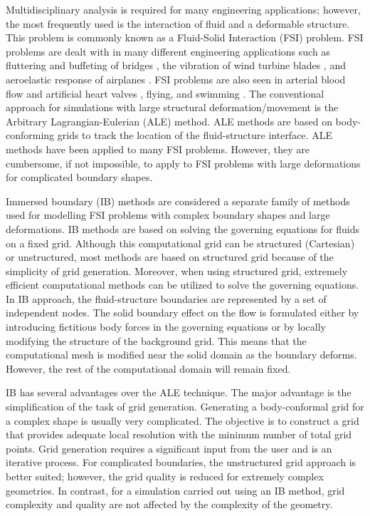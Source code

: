 Multidisciplinary analysis is required for many engineering applications; however, the most frequently used is the interaction of fluid and a deformable structure. This problem is commonly known as a Fluid-Solid Interaction (FSI) problem. FSI problems are dealt with in many different engineering applications such as fluttering and buffeting of bridges \cite{jain1996coupled}, the vibration of wind turbine blades \cite{arrigan2011control}, and aeroelastic response of airplanes \cite{farhat2006provably}. FSI problems are also seen in arterial blood flow and artificial heart valves \cite{sotiropoulos2009review}, flying, and swimming \cite{kern2006simulations}. The conventional approach for simulations with large structural deformation/movement is the Arbitrary Lagrangian-Eulerian (ALE) method. ALE methods are based on body-conforming grids to track the location of the fluid-structure interface. ALE methods have been applied to many FSI problems. However, they are cumbersome, if not impossible, to apply to FSI problems with large deformations for complicated boundary shapes.

Immersed boundary (IB) methods are considered a separate family of methods used for modelling FSI problems with complex boundary shapes and large deformations. IB methods are based on solving the governing equations for fluids on a fixed grid. Although this computational grid can be structured (Cartesian) or unstructured, most methods are based on structured grid because of the simplicity of grid generation. Moreover, when using structured grid, extremely efficient computational methods can be utilized to solve the governing equations. In IB approach, the fluid-structure boundaries are represented by a set of independent nodes. The solid boundary effect on the flow is formulated either by introducing fictitious body forces in the governing equations or by locally modifying the structure of the background grid. This means that the computational mesh is modified near the solid domain as the boundary deforms. However, the rest of the computational domain will remain fixed.

IB has several advantages over the ALE technique. The major advantage is the simplification of the task of grid generation. Generating a body-conformal grid for a complex shape is usually very complicated. The objective is to construct a grid that provides adequate local resolution with the minimum number of total grid points. Grid generation requires a significant input from the user and is an iterative process. For complicated boundaries, the unstructured grid approach is better suited; however, the grid quality is reduced for extremely complex geometries. In contrast, for a simulation carried out using an IB method, grid complexity and quality are not affected by the complexity of the geometry. 

